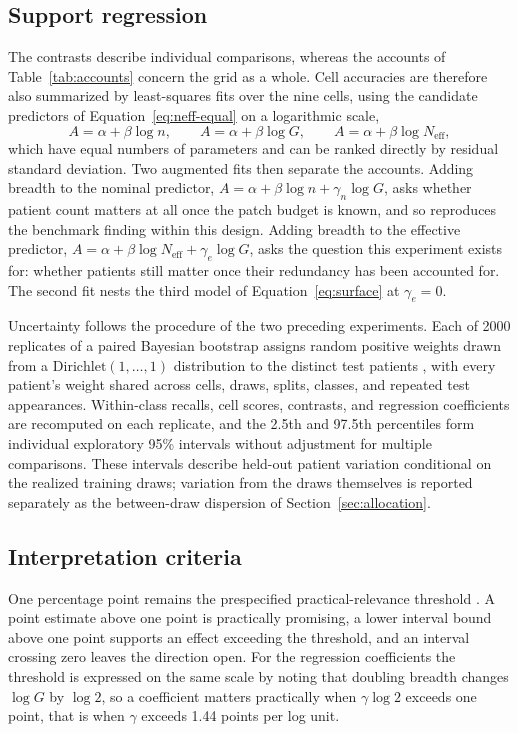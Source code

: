 \documentclass[11pt]{article}
\newcommand{\Neff}{N_{\mathrm{eff}}}
\begin{document}
\subsection{Support regression}
\label{sec:surface}
The contrasts describe individual comparisons, whereas the accounts of Table~\ref{tab:accounts} concern the grid as a whole. Cell accuracies are therefore also summarized by least-squares fits over the nine cells, using the candidate predictors of Equation~\eqref{eq:neff-equal} on a logarithmic scale,
\begin{equation}
  A=\alpha+\beta\log n,
  \qquad
  A=\alpha+\beta\log G,
  \qquad
  A=\alpha+\beta\log\Neff,
  \label{eq:surface}
\end{equation}
\noindent which have equal numbers of parameters and can be ranked directly by residual standard deviation. Two augmented fits then separate the accounts. Adding breadth to the nominal predictor, $A=\alpha+\beta\log n+\gamma_n\log G$, asks whether patient count matters at all once the patch budget is known, and so reproduces the benchmark finding within this design. Adding breadth to the effective predictor, $A=\alpha+\beta\log\Neff+\gamma_e\log G$, asks the question this experiment exists for: whether patients still matter once their redundancy has been accounted for. The second fit nests the third model of Equation~\eqref{eq:surface} at $\gamma_e=0$.

Uncertainty follows the procedure of the two preceding experiments. Each of \num{2000} replicates of a paired Bayesian bootstrap assigns random positive weights drawn from a $\mathrm{Dirichlet}(1,\ldots,1)$ distribution to the distinct test patients \citep{rubin1981bayesian}, with every patient's weight shared across cells, draws, splits, classes, and repeated test appearances. Within-class recalls, cell scores, contrasts, and regression coefficients are recomputed on each replicate, and the 2.5th and 97.5th percentiles form individual exploratory 95\% intervals without adjustment for multiple comparisons. These intervals describe held-out patient variation conditional on the realized training draws; variation from the draws themselves is reported separately as the between-draw dispersion of Section~\ref{sec:allocation}.

\subsection{Interpretation criteria}
\label{sec:interpretation}
One percentage point remains the prespecified practical-relevance threshold \citep{queisler2026patientShortage}. A point estimate above one point is practically promising, a lower interval bound above one point supports an effect exceeding the threshold, and an interval crossing zero leaves the direction open. For the regression coefficients the threshold is expressed on the same scale by noting that doubling breadth changes $\log G$ by $\log 2$, so a coefficient matters practically when $\gamma\log 2$ exceeds one point, that is when $\gamma$ exceeds 1.44 points per log unit.
\end{document}
